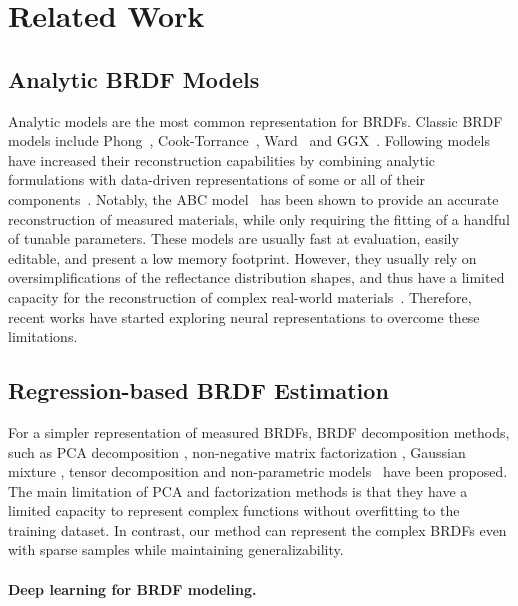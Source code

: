 \section{Related Work}
\label{sec:relatedwork}


\subsection{Analytic BRDF Models}
\label{hyperbrdf-RW}
Analytic models are the most common representation for BRDFs. Classic BRDF models include Phong~\cite{blinn77}, Cook-Torrance~\cite{cooktorrance1982}, Ward~\cite{ward1992} and GGX~\cite{walter2007microfacet}. Following models have increased their reconstruction capabilities by combining analytic formulations with data-driven representations of some or all of their components~\cite{dupuy2015, ashikhmin2007, bagher2016}. Notably, the ABC model~\cite{low2012} has been shown to provide an accurate reconstruction of measured materials, while only requiring the fitting of a handful of tunable parameters. These models are usually fast at evaluation, easily editable, and present a low memory footprint. However, they usually rely on oversimplifications of the reflectance distribution shapes, and thus have a limited capacity for the reconstruction of complex real-world materials~\cite{ngan2005, guarnera2016}. Therefore, recent works have started exploring neural representations to overcome these limitations.



\subsection{Regression-based BRDF Estimation}
For a simpler representation of measured BRDFs, BRDF decomposition methods, such as PCA decomposition 
\cite{matusik2003data, nielsen2015optimal, serrano2018intuitive}, non-negative matrix factorization \cite{lawrence2004efficient, lawrence2006inverse}, Gaussian mixture \cite{sun2007interactive}, tensor decomposition \cite{bilgili2011general, tongbuasirilai2020compact} 
and non-parametric models~\cite{bagher2016non} have been proposed. The main limitation of PCA and factorization methods is  that they have a limited capacity to represent complex functions without overfitting to the training dataset. In contrast, our method can represent the complex BRDFs even with sparse samples while maintaining generalizability.


\paragraph{Deep learning for BRDF modeling.}

